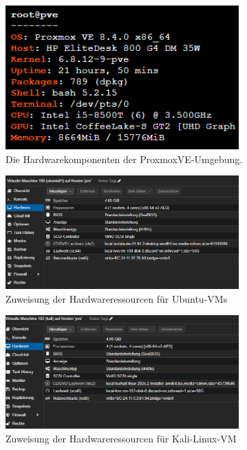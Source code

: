 \documentclass[12pt]{scrreprt}
\begin{document}
\begin{thebibliography}{99}
\begin{figure}[htbp]
	\centering
	\includegraphics[width=0.8\textwidth]{proxmox-hardware.png}
	\caption{Die Hardwarekomponenten der ProxmoxVE-Umgebung.}
	\label{fig:hardware-prox} %
\end{figure}

\begin{figure}[htbp]
	\centering
	\includegraphics[width=0.8\textwidth]{ubuntu01-hardware.png}
	\caption{Zuweisung der Hardwareressourcen für Ubuntu-VMs}
	\label{fig:ubuntu-hardware} %
\end{figure}

\begin{figure}[htbp]
	\centering
	\includegraphics[width=0.8\textwidth]{kalivm-hardware.png}
	\caption{Zuweisung der Hardwareressourcen für Kali-Linux-VM}
	\label{fig:kali-hardware} %
\end{figure}


\end{thebibliography}
\end{document}
